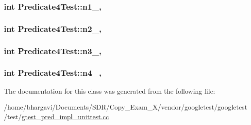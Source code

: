 \subsubsection[{\texorpdfstring{n1\+\_\+}{n1_}}]{\setlength{\rightskip}{0pt plus 5cm}int Predicate4\+Test\+::n1\+\_\+\hspace{0.3cm}{\ttfamily [static]}, {\ttfamily [protected]}}\hypertarget{class_predicate4_test_a8eb30cd283e613f7a2e501a3969be9ae}{}\label{class_predicate4_test_a8eb30cd283e613f7a2e501a3969be9ae}
\subsubsection[{\texorpdfstring{n2\+\_\+}{n2_}}]{\setlength{\rightskip}{0pt plus 5cm}int Predicate4\+Test\+::n2\+\_\+\hspace{0.3cm}{\ttfamily [static]}, {\ttfamily [protected]}}\hypertarget{class_predicate4_test_a088fce743c747e3851c926cb3a87fda3}{}\label{class_predicate4_test_a088fce743c747e3851c926cb3a87fda3}
\subsubsection[{\texorpdfstring{n3\+\_\+}{n3_}}]{\setlength{\rightskip}{0pt plus 5cm}int Predicate4\+Test\+::n3\+\_\+\hspace{0.3cm}{\ttfamily [static]}, {\ttfamily [protected]}}\hypertarget{class_predicate4_test_a00ae6ae54c7d6639d448c036aedb6114}{}\label{class_predicate4_test_a00ae6ae54c7d6639d448c036aedb6114}
\subsubsection[{\texorpdfstring{n4\+\_\+}{n4_}}]{\setlength{\rightskip}{0pt plus 5cm}int Predicate4\+Test\+::n4\+\_\+\hspace{0.3cm}{\ttfamily [static]}, {\ttfamily [protected]}}\hypertarget{class_predicate4_test_ae42e23ce11e3f1c6b813496d6180cc67}{}\label{class_predicate4_test_ae42e23ce11e3f1c6b813496d6180cc67}


The documentation for this class was generated from the following file\+:\begin{DoxyCompactItemize}
\item 
/home/bhargavi/\+Documents/\+S\+D\+R/\+Copy\+\_\+\+Exam\+\_\+X/vendor/googletest/googletest/test/\hyperlink{gtest__pred__impl__unittest_8cc}{gtest\+\_\+pred\+\_\+impl\+\_\+unittest.\+cc}\end{DoxyCompactItemize}
